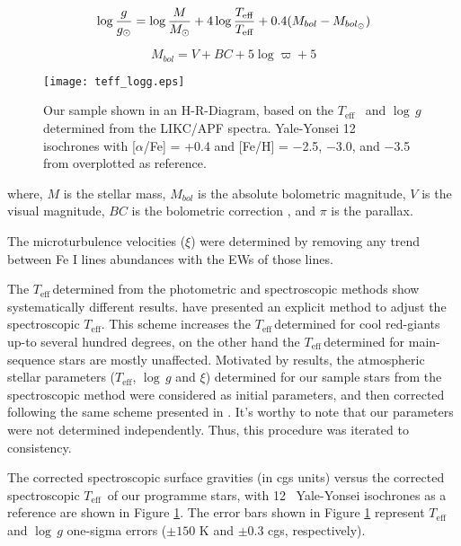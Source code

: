 \begin{equation}\label{eq:2}
\log \frac{g}{g_{\odot}} = \log \frac{M}{M_{\odot}} + 4 \log 
\frac{T_{\rm eff}}{T_{\rm eff}} + 0.4(M_{bol} - M_{bol_{\odot}})
\end{equation}


\begin{equation}\label{eq:3}
M_{bol} = V+BC+5 \log \varpi+5
\end{equation}

\begin{figure}[!ht]
\centering
\texttt{[image: teff\_logg.eps]}
   \caption{Our sample shown in an H-R-Diagram, based on the \ensuremath{T_\mathrm{eff}} ~and \ensuremath{\log\,g}  determined from the LIKC/APF spectra.
   Yale-Yonsei 12 \Gyr~ isochrones with [$\alpha$/Fe] = +0.4 and [Fe/H] = $-$2.5, $-$3.0, and $-$3.5 from \citet{2004ApJS..155..667D}  overplotted as reference.}
\label{fig:isoch}
\end{figure}


where, $M$ is the stellar mass, $M_{bol}$ is the absolute bolometric magnitude, 
$V$ is the visual magnitude, $BC$ is the bolometric correction \citep[see][Eq. 18]{1999A&AS..140..261A}, and $\pi$ is the parallax.

The microturbulence velocities ($\xi$) were determined by removing any trend between Fe I lines 
abundances with the EWs of those lines. 


The \ensuremath{T_\mathrm{eff}}\,determined from the photometric and spectroscopic methods show 
systematically different results. \citet{2013ApJ...769...57F} have presented an explicit method to adjust the spectroscopic \ensuremath{T_\mathrm{eff}}. 
This scheme increases the \ensuremath{T_\mathrm{eff}}\,determined for cool red-giants up-to several hundred degrees, 
on the other hand the \ensuremath{T_\mathrm{eff}}\,determined for main-sequence stars are mostly unaffected.
Motivated by \citet{2013ApJ...769...57F} results, the atmospheric stellar parameters 
(\ensuremath{T_\mathrm{eff}}, \ensuremath{\log\,g} and $\xi$) determined for our sample stars from the spectroscopic method were considered 
as initial parameters, and then corrected following the same scheme presented in \citet{2013ApJ...769...57F}.
It's worthy to note that our parameters were not determined independently. Thus, this procedure was iterated to consistency.

The corrected spectroscopic surface gravities (in cgs units) 
versus the corrected spectroscopic \ensuremath{T_\mathrm{eff}}~of our programme stars, with 12 \Gyr~Yale-Yonsei isochrones as a reference \citep{2004ApJS..155..667D} 
are shown in Figure \ref{fig:isoch}. The error bars shown in Figure \ref{fig:isoch} represent \ensuremath{T_\mathrm{eff}}~ and \ensuremath{\log\,g} one-sigma errors ($\pm 150$ K and $\pm 0.3$ cgs, respectively).



